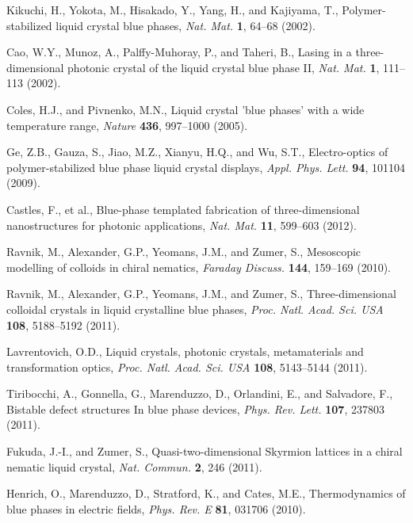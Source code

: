 \documentclass[12pt]{article}
\begin{document}
\begin{thebibliography}{99}
Kikuchi, H., Yokota, M., Hisakado, Y., Yang, H., and Kajiyama, T.,
Polymer-stabilized liquid crystal blue phases,
{\it Nat. Mat.} {\bf 1}, 64--68 (2002).

Cao, W.Y., Munoz, A., Palffy-Muhoray, P., and  Taheri, B.,
Lasing in a three-dimensional photonic crystal of the liquid crystal blue 
phase II,
{\it Nat. Mat.} {\bf 1}, 111--113 (2002).

Coles, H.J., and  Pivnenko, M.N.,
Liquid crystal 'blue phases' with a wide temperature range,
{\it Nature} {\bf 436}, 997--1000 (2005).

Ge, Z.B., Gauza, S., Jiao, M.Z., Xianyu, H.Q., and  Wu, S.T.,
 Electro-optics of polymer-stabilized blue phase liquid crystal displays,
{\it Appl. Phys. Lett.} {\bf 94}, 101104 (2009).

Castles, F., et al.,
Blue-phase templated fabrication of three-dimensional nanostructures for
photonic applications, {\it Nat. Mat.} {\bf 11}, 599--603 (2012).

Ravnik, M., Alexander, G.P., Yeomans, J.M., and Zumer, S.,
Mesoscopic modelling of colloids in chiral nematics,
{\it Faraday Discuss.} {\bf 144}, 159--169 (2010).

Ravnik, M., Alexander, G.P.,  Yeomans, J.M., and  Zumer, S.,
Three-dimensional colloidal crystals in liquid crystalline 
blue phases, {\it Proc. Natl. Acad. Sci. USA} {\bf 108}, 5188--5192 (2011).

 Lavrentovich, O.D.,
 Liquid crystals, photonic crystals, metamaterials and transformation optics, 
{\it Proc. Natl. Acad. Sci. USA} {\bf 108}, 5143--5144 (2011).

Tiribocchi, A., Gonnella, G., Marenduzzo, D., Orlandini, E., and Salvadore, F.,
Bistable defect structures In blue phase devices,
 {\it Phys. Rev. Lett.} {\bf 107}, 237803 (2011).

Fukuda, J.-I., and Zumer, S.,
Quasi-two-dimensional Skyrmion lattices in a chiral nematic liquid crystal,
{\it Nat. Commun.} {\bf 2}, 246 (2011).

Henrich, O., Marenduzzo, D., Stratford, K., and  Cates, M.E.,
Thermodynamics of blue phases in electric fields,
{\it Phys. Rev. E} {\bf 81}, 031706 (2010).


\end{thebibliography}
\end{document}
